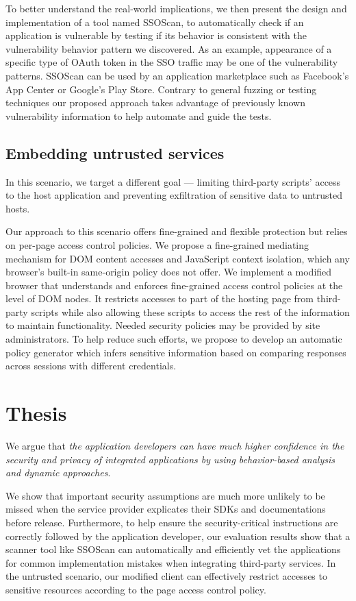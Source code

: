 To better understand the real-world implications, we then present the design and implementation of a tool named SSOScan, to automatically check if an application is vulnerable by testing if its behavior is consistent with the vulnerability behavior pattern we discovered.  As an example, appearance of a specific type of OAuth token in the SSO traffic may be one of the vulnerability patterns.  SSOScan can be used by an application marketplace such as Facebook's App Center or Google's Play Store.  Contrary to general fuzzing or testing techniques our proposed approach takes advantage of previously known vulnerability information to help automate and guide the tests.  

\subsection{Embedding untrusted services} 

In this scenario, we target a different goal --- limiting third-party scripts' access to the host application and preventing exfiltration of sensitive data to untrusted hosts.

Our approach to this scenario offers fine-grained and flexible protection but relies on per-page access control policies.  We propose a fine-grained mediating mechanism for DOM content accesses and JavaScript context isolation, which any browser's built-in same-origin policy does not offer.  We implement a modified browser that understands and enforces fine-grained access control policies at the level of DOM nodes.  It restricts accesses to part of the hosting page from third-party scripts while also allowing these scripts to access the rest of the information to maintain functionality.  Needed security policies may be provided by site administrators.  To help reduce such efforts, we propose to develop an automatic policy generator which infers sensitive information based on comparing responses across sessions with different credentials.

\section{Thesis}

We argue that \emph{the application developers can have much higher confidence in the security and privacy of integrated applications by using behavior-based analysis and dynamic approaches}.  

We show that important security assumptions are much more unlikely to be missed when the service provider explicates their SDKs and documentations before release.  Furthermore, to help ensure the security-critical instructions are correctly followed by the application developer, our evaluation results show that a scanner tool like SSOScan can automatically and efficiently vet the applications for common implementation mistakes when integrating third-party services.  In the untrusted scenario, our modified client can effectively restrict accesses to sensitive resources according to the page access control policy.

